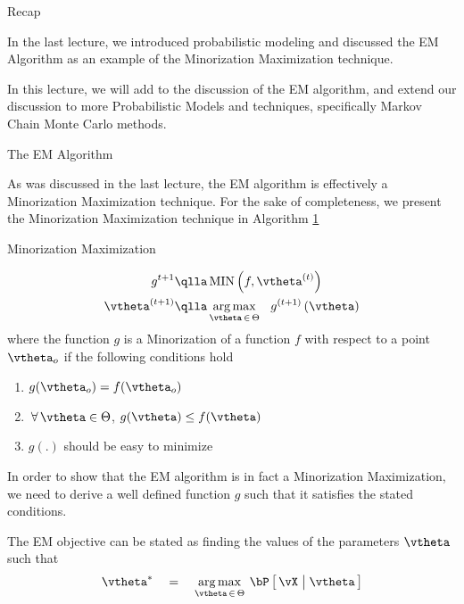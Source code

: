 \documentclass[11pt,a4paper]{article}
\begin{document}
\makeheader

\begin{ssection}{Recap}

	In the last lecture, we introduced probabilistic modeling and discussed the EM Algorithm as an example of the Minorization Maximization technique.

	In this lecture, we will add to the discussion of the EM algorithm, and extend our discussion to more Probabilistic Models and techniques, specifically Markov Chain Monte Carlo methods.

\end{ssection}

\begin{ssection}{The EM Algorithm}

	As was discussed in the last lecture, the EM algorithm is effectively a Minorization Maximization technique. For the sake of completeness, we present the Minorization Maximization technique in Algorithm \hyperlink{algo:1}{1}

	\begin{algo}[0.9\textwidth]{Minorization Maximization}

		\begin{align*}
			g^{t +1}	&\qlla	\tfunc{MIN}{f, \vtheta^{(t)}} \\
			\vtheta^{(t + 1)}	&\qlla	\argmax{\vtheta\,\in\,\Theta}\ \func{g^{(t + 1)}}{\vtheta}
		\end{align*}
		where the function $g$ is a Minorization of a function $f$ with respect to a point $\vtheta_o$ if the following conditions hold
		\begin{enumerate}[label=\bt{\theenumi.}]
			\item $g(\vtheta_o) = f(\vtheta_o)$
			\item $\qforall \vtheta \in \Theta$, $g(\vtheta) \le f(\vtheta)$
			\item $g(.)$ should be easy to minimize
		\end{enumerate}

	\end{algo}

	In order to show that the EM algorithm is in fact a Minorization Maximization, we need to derive a well defined function $g$ such that it satisfies the stated conditions.

	The EM objective can be stated as finding the values of the parameters $\vtheta$ such that
	\begin{align*}
		\vtheta^{\ast} \eq \argmax{\vtheta\,\in\,\Theta} \prob{\vX \pipe \vtheta}
	\end{align*}


\end{ssection}
\end{document}

